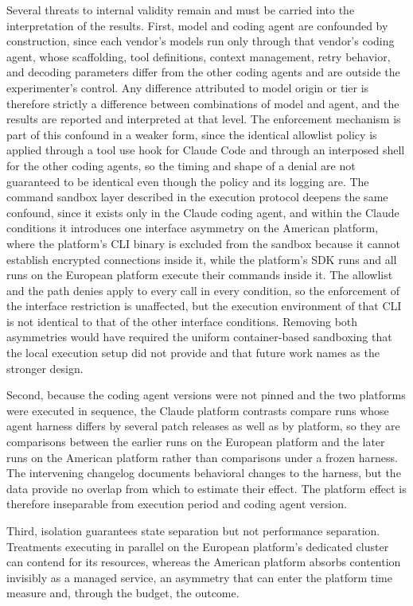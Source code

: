 \documentclass[
english,                 %
bibtex,                  %
]{kththesis}
\numberwithin{listing}{chapter}
\begin{document}
Several threats to internal validity remain and must be carried into the interpretation of the results. First, model and coding agent are confounded by construction, since each vendor's models run only through that vendor's coding agent, whose scaffolding, tool definitions, context management, retry behavior, and decoding parameters differ from the other coding agents and are outside the experimenter's control. Any difference attributed to model origin or tier is therefore strictly a difference between combinations of model and agent, and the results are reported and interpreted at that level. The enforcement mechanism is part of this confound in a weaker form, since the identical allowlist policy is applied through a tool use hook for Claude Code and through an interposed shell for the other coding agents, so the timing and shape of a denial are not guaranteed to be identical even though the policy and its logging are. The command sandbox layer described in the execution protocol deepens the same confound, since it exists only in the Claude coding agent, and within the Claude conditions it introduces one interface asymmetry on the American platform, where the platform's \gls{CLI} binary is excluded from the sandbox because it cannot establish encrypted connections inside it, while the platform's \gls{SDK} runs and all runs on the European platform execute their commands inside it. The allowlist and the path denies apply to every call in every condition, so the enforcement of the interface restriction is unaffected, but the execution environment of that \gls{CLI} is not identical to that of the other interface conditions. Removing both asymmetries would have required the uniform container-based sandboxing that the local execution setup did not provide and that future work names as the stronger design.

Second, because the coding agent versions were not pinned and the two platforms were executed in sequence, the Claude platform contrasts compare runs whose agent harness differs by several patch releases as well as by platform, so they are comparisons between the earlier runs on the European platform and the later runs on the American platform rather than comparisons under a frozen harness. The intervening changelog documents behavioral changes to the harness, but the data provide no overlap from which to estimate their effect. The platform effect is therefore inseparable from execution period and coding agent version.

Third, isolation guarantees state separation but not performance separation. Treatments executing in parallel on the European platform's dedicated cluster can contend for its resources, whereas the American platform absorbs contention invisibly as a managed service, an asymmetry that can enter the platform time measure and, through the budget, the outcome.
\end{document}
